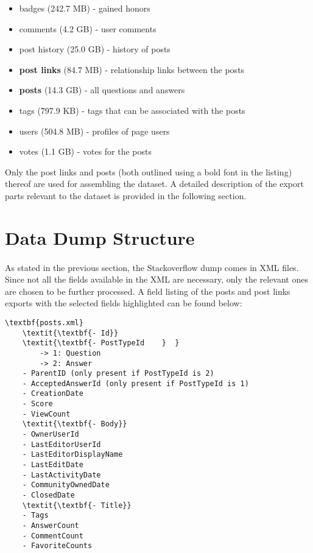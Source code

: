 \begin{itemize}
	\setlength\itemsep{0.03em}
	\item badges (242.7 MB) - gained honors
	\item comments (4.2 GB) - user comments
	\item post history (25.0 GB) - history of posts
	\item \textbf{post links} (84.7 MB) - relationship links between the posts
	\item \textbf{posts} (14.3 GB) - all questions and answers
	\item tags (797.9 KB) - tags that can be associated with the posts
	\item users (504.8 MB) - profiles of page users
	\item votes (1.1 GB) - votes for the posts
\end{itemize} 

Only the post links and posts (both outlined using a bold font in the listing) thereof are used for assembling the dataset. A detailed description of the export parts relevant to the dataset is provided in the following section.

\section{Data Dump Structure}
\paragraph{}
As stated in the previous section, the Stackoverflow dump comes in XML files. Since not all the fields available in the XML are necessary, only the relevant ones are chosen to be further processed. A field listing of the posts and post links exports with the selected fields highlighted can be found below:

\begin{Verbatim}[commandchars=\\\{\},codes={\catcode`$=3\catcode`_=8}]
\textbf{posts.xml}
	\textit{\textbf{- Id}}
	\textit{\textbf{- PostTypeId    }  }  	
		-> 1: Question
		-> 2: Answer
	- ParentID (only present if PostTypeId is 2)
	- AcceptedAnswerId (only present if PostTypeId is 1)
	- CreationDate
	- Score
	- ViewCount
	\textit{\textbf{- Body}}
	- OwnerUserId
	- LastEditorUserId
	- LastEditorDisplayName
	- LastEditDate
	- LastActivityDate
	- CommunityOwnedDate
	- ClosedDate
	\textit{\textbf{- Title}}
	- Tags
	- AnswerCount
	- CommentCount
	- FavoriteCounts
\end{Verbatim}

